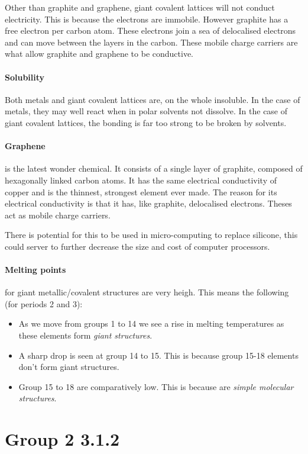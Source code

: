 	Other than graphite and graphene, giant covalent lattices will not conduct electricity.
	This is because the electrons are immobile. However graphite has a free electron per carbon atom. 
	These electrons join a sea of delocalised electrons and can move between the layers in the carbon.
	These mobile charge carriers are what allow graphite and graphene to be conductive.
	
	\paragraph{Solubility} Both metals and giant covalent lattices are, on the whole insoluble.
	In the case of metals, they may well react when in polar solvents not dissolve.
	In the case of giant covalent lattices, the bonding is far too strong to be broken by solvents.
	
	\paragraph{Graphene} is the latest wonder chemical.
	It consists of a single layer of graphite, composed of hexagonally linked carbon atoms.
	It has the same electrical conductivity of copper and is the thinnest, strongest element ever made.
	The reason for its electrical conductivity is that it has, like graphite, delocalised electrons.
	Theses act as mobile charge carriers.
	
	There is potential for this to be used in micro-computing to replace silicone, this could server to further decrease the size and cost of computer processors.
	
	\paragraph{Melting points} for giant metallic/covalent structures are very heigh.
	This means the following (for periods 2 and 3):
	\begin{itemize}
		\item As we move from groups 1 to 14 we see a rise in melting temperatures as these elements form \textit{giant structures}.
		\item A sharp drop is seen at group 14 to 15. This is because group 15-18 elements don't form giant structures.
		\item Group 15 to 18 are comparatively low. This is because are \textit{simple molecular structures}.
	\end{itemize}
\section{Group 2 3.1.2}

